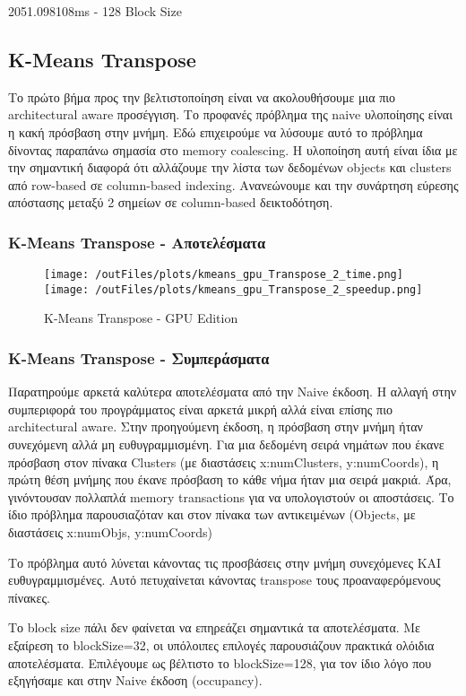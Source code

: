 \documentclass[../final_report.tex]{subfiles}
\begin{document}
2051.098108ms - 128 Block Size

\subsection{K-Means Transpose}
Το πρώτο βήμα προς την βελτιστοποίηση είναι να ακολουθήσουμε μια πιο architectural aware προσέγγιση. Το προφανές πρόβλημα της naive 
υλοποίησης είναι η κακή πρόσβαση στην μνήμη. Εδώ επιχειρούμε να λύσουμε αυτό το πρόβλημα δίνοντας παραπάνω σημασία στο memory coalescing.
Η υλοποίηση αυτή είναι ίδια με την σημαντική διαφορά ότι αλλάζουμε την λίστα των δεδομένων objects και clusters από row-based
σε column-based indexing. Ανανεώνουμε και την συνάρτηση εύρεσης απόστασης μεταξύ 2 σημείων σε column-based δεικτοδότηση.

\subsubsection*{K-Means Transpose - Αποτελέσματα}

\begin{figure}[H]
    \centering
    \texttt{[image: /outFiles/plots/kmeans\_gpu\_Transpose\_2\_time.png]}
    \texttt{[image: /outFiles/plots/kmeans\_gpu\_Transpose\_2\_speedup.png]}
    \caption{K-Means Transpose - GPU Edition}
    \label{fig:K-Means Transpose - GPU Edition}
\end{figure}

\subsubsection*{K-Means Transpose - Συμπεράσματα}
Παρατηρούμε αρκετά καλύτερα αποτελέσματα από την Naive έκδοση. Η αλλαγή στην συμπεριφορά του προγράμματος είναι 
αρκετά μικρή αλλά είναι επίσης πιο architectural aware. Στην προηγούμενη έκδοση, η πρόσβαση στην μνήμη ήταν συνεχόμενη αλλά
μη ευθυγραμμισμένη. Για μια δεδομένη σειρά νημάτων που έκανε πρόσβαση στον πίνακα Clusters (με διαστάσεις x:numClusters, y:numCoords),
η πρώτη θέση μνήμης που έκανε πρόσβαση το κάθε νήμα ήταν μια σειρά μακριά. Άρα, γινόντουσαν πολλαπλά memory transactions για να υπολογιστούν
οι αποστάσεις. Το ίδιο πρόβλημα παρουσιαζόταν και στον πίνακα των αντικειμένων (Objects, με διαστάσεις x:numObjs, y:numCoords)

Το πρόβλημα αυτό λύνεται κάνοντας τις προσβάσεις στην μνήμη συνεχόμενες ΚΑΙ ευθυγραμμισμένες. Αυτό πετυχαίνεται κάνοντας transpose τους προαναφερόμενους
πίνακες.

Το block size πάλι δεν φαίνεται να επηρεάζει σημαντικά τα αποτελέσματα. Με εξαίρεση το blockSize=32, οι υπόλοιπες επιλογές παρουσιάζουν
πρακτικά ολόιδια αποτελέσματα. Επιλέγουμε ως βέλτιστο το blockSize=128, για τον ίδιο λόγο που εξηγήσαμε και στην Naive έκδοση (occupancy).
\end{document}
